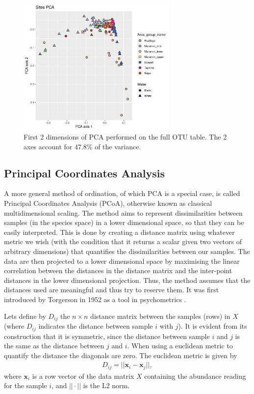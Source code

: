 \begin{figure}
\centering
\includegraphics[width = 0.7\textwidth]{"pcaotu12"}
\caption{First 2 dimensions of PCA performed on the full OTU table. The 2 axes account for 47.8\% of the variance.}
\label{fig:pcaotu12}
\end{figure}

\subsection{Principal Coordinates Analysis}
A more general method of ordination, of which PCA is a special case, is called Principal Coordinates Analysis (PCoA), otherwise known as classical multidimensional scaling. The method aims to represent dissimilarities between samples (in the species space) in a lower dimensional space, so that they can be easily interpreted. This is done by creating a distance matrix using whatever metric we wish (with the condition that it returns a scalar given two vectors of arbitrary dimensions) that quantifies the dissimilarities between our samples. The data are then projected to a lower dimensional space by maximising the linear correlation between the distances in the distance matrix and the inter-point distances in the lower dimensional projection. Thus, the method assumes that the distances used are meaningful and thus try to reserve them. It was first introduced by Torgerson in 1952 as a tool in psychometrics \cite{torgerson_multidimensional_1952}.

Lets define by $D_{ij}$ the $n \times n$ distance matrix between the samples (rows) in $X$ (where $D_{ij}$ indicates the distance between sample $i$ with $j$). It is evident from its construction that it is symmetric, since the distance between sample $i$ and $j$ is the same as the distance between $j$ and $i$. When using a euclidean metric to quantify the distance the diagonals are zero. The euclidean metric is given by
\begin{align}
D_{ij} = {||\mathbf{x}_i- \mathbf{x}_j||},
\label{eq:euclideanmetric}
\end{align}
where $ \mathbf{x}_i$ is a row vector of the data matrix $X$ containing the abundance reading for the sample $i$, and $||\cdot||$ is the L2 norm.


